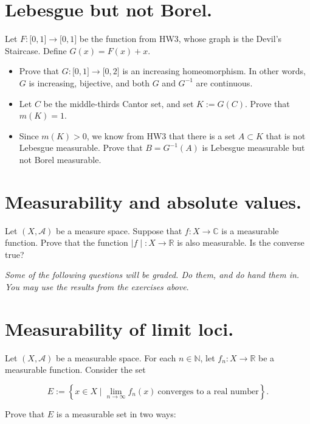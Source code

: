 \documentclass{qlnotes-export}
\begin{document}
\section{Lebesgue but not Borel.}

Let \(F:\lbrack 0,1\rbrack\rightarrow\lbrack 0,1\rbrack\) be the function from HW3, whose graph is the Devil's Staircase. Define \(G(x) = F(x) + x\).

\begin{itemize}
\item
  Prove that \(G:\lbrack 0,1\rbrack\rightarrow\lbrack 0,2\rbrack\) is an increasing homeomorphism. In other words, \(G\) is increasing, bijective, and both \(G\) and \(G^{- 1}\) are continuous.
\item
  Let \(C\) be the middle-thirds Cantor set, and set \(K := G(C)\). Prove that \(m(K) = 1\).
\item
  Since \(m(K) > 0\), we know from HW3 that there is a set \(A \subset K\) that is not Lebesgue measurable. Prove that \(B = G^{- 1}(A)\) is Lebesgue measurable but not Borel measurable.
\end{itemize}

\section{Measurability and absolute values.}

Let \((X,\mathcal{A})\) be a measure space. Suppose that \(f:X\rightarrow{\mathbb{C}}\) is a measurable function. Prove that the function \(\left. |f \middle| :X\rightarrow{\mathbb{R}} \right.\) is also measurable. Is the converse true?

\emph{Some of the following questions will be graded. Do them, and do hand them in. You may use the results from the exercises above}.

\section{Measurability of limit loci.}

Let \((X,\mathcal{A})\) be a measurable space. For each \(n \in {\mathbb{N}}\), let \(f_{n}:X\rightarrow{\mathbb{R}}\) be a measurable function. Consider the set

\[E := \left\{ {x \in X \mid \lim\limits_{n\rightarrow\infty}f_{n}(x)\ \text{converges to a real number}} \right\}.\]

Prove that \(E\) is a measurable set in two ways:
\end{document}
